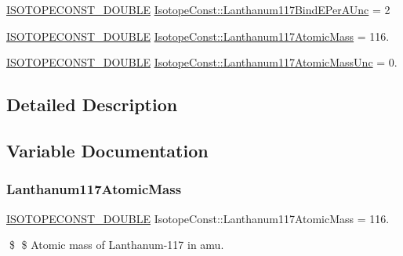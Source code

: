 \begin{DoxyCompactItemize}
\mbox{\hyperlink{group___isotope_const-_macros_ga8f45a7272ce02c0b4c65c44636ed719a}{I\+S\+O\+T\+O\+P\+E\+C\+O\+N\+S\+T\+\_\+\+D\+O\+U\+B\+LE}} \mbox{\hyperlink{group___isotope_const-_lanthanum-_la117_gaed3003b9ca06b0e773afa0a1200fe6f4}{Isotope\+Const\+::\+Lanthanum117\+Bind\+E\+Per\+A\+Unc}} = 2
\item 
\mbox{\hyperlink{group___isotope_const-_macros_ga8f45a7272ce02c0b4c65c44636ed719a}{I\+S\+O\+T\+O\+P\+E\+C\+O\+N\+S\+T\+\_\+\+D\+O\+U\+B\+LE}} \mbox{\hyperlink{group___isotope_const-_lanthanum-_la117_gaa5c763b7e2b95483abecbc6ac556f894}{Isotope\+Const\+::\+Lanthanum117\+Atomic\+Mass}} = 116.
\item 
\mbox{\hyperlink{group___isotope_const-_macros_ga8f45a7272ce02c0b4c65c44636ed719a}{I\+S\+O\+T\+O\+P\+E\+C\+O\+N\+S\+T\+\_\+\+D\+O\+U\+B\+LE}} \mbox{\hyperlink{group___isotope_const-_lanthanum-_la117_ga2a416e5ae04b4963db2927ba1b87de1b}{Isotope\+Const\+::\+Lanthanum117\+Atomic\+Mass\+Unc}} = 0.
\end{DoxyCompactItemize}


\subsection{Detailed Description}


\subsection{Variable Documentation}
\mbox{\label{group___isotope_const-_lanthanum-_la117_gaa5c763b7e2b95483abecbc6ac556f894}} 
\subsubsection{\texorpdfstring{Lanthanum117\+Atomic\+Mass}{Lanthanum117AtomicMass}}
{\footnotesize\ttfamily \mbox{\hyperlink{group___isotope_const-_macros_ga8f45a7272ce02c0b4c65c44636ed719a}{I\+S\+O\+T\+O\+P\+E\+C\+O\+N\+S\+T\+\_\+\+D\+O\+U\+B\+LE}} Isotope\+Const\+::\+Lanthanum117\+Atomic\+Mass = 116.}

\$ \$ Atomic mass of Lanthanum-\/117 in amu. \mbox{\label{group___isotope_const-_lanthanum-_la117_ga2a416e5ae04b4963db2927ba1b87de1b}} 
